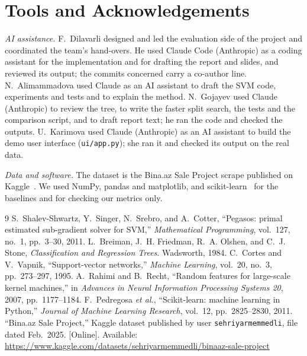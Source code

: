 \documentclass[10pt,twocolumn,a4paper]{article}
\begin{document}
\section*{Tools and Acknowledgements}
\textit{AI assistance.} F.~Dilavarli designed and led the evaluation side
of the project and coordinated the team's hand-overs. He used Claude Code
(Anthropic) as a coding assistant for the implementation and for drafting
the report and slides, and reviewed its output; the commits concerned carry
a co-author line.
N.~Alimammadova used Claude as an AI assistant to draft the SVM code,
experiments and tests and to explain the method.
N.~Gojayev used Claude (Anthropic) to review the tree, to write the faster
split search, the tests and the comparison script, and to draft report
text; he ran the code and checked the outputs.
U.~Karimova used Claude (Anthropic) as an AI assistant to build the demo
user interface (\texttt{ui/app.py}); she ran it and checked its output on
the real data.

\textit{Data and software.} The dataset is the Bina.az Sale Project
scrape published on Kaggle~\cite{dataset}. We used NumPy, pandas and
matplotlib, and scikit-learn~\cite{sklearn} for the baselines and for
checking our metrics only.

\begin{thebibliography}{9}
S.~Shalev-Shwartz, Y.~Singer, N.~Srebro, and A.~Cotter,
``Pegasos: primal estimated sub-gradient solver for SVM,''
\emph{Mathematical Programming}, vol.~127, no.~1, pp.~3--30, 2011.
L.~Breiman, J.~H. Friedman, R.~A. Olshen, and C.~J. Stone,
\emph{Classification and Regression Trees}. Wadsworth, 1984.
C.~Cortes and V.~Vapnik, ``Support-vector networks,''
\emph{Machine Learning}, vol.~20, no.~3, pp.~273--297, 1995.
A.~Rahimi and B.~Recht, ``Random features for large-scale kernel
machines,'' in \emph{Advances in Neural Information Processing Systems
20}, 2007, pp.~1177--1184.
F.~Pedregosa \emph{et al.}, ``Scikit-learn: machine learning in Python,''
\emph{Journal of Machine Learning Research}, vol.~12, pp.~2825--2830, 2011.
``Bina.az Sale Project,'' Kaggle dataset published by user
\texttt{sehriyarmemmedli}, file dated Feb.~2025.
[Online]. Available:
\url{https://www.kaggle.com/datasets/sehriyarmemmedli/binaaz-sale-project}
\end{thebibliography}
\end{document}
